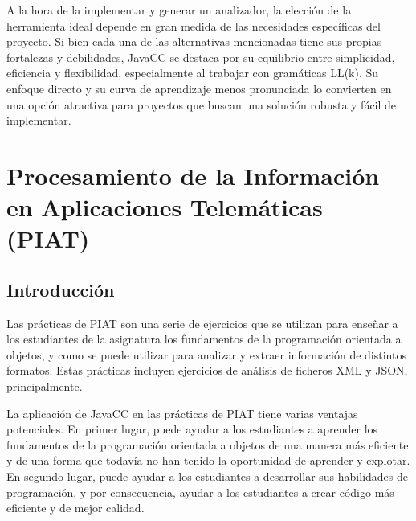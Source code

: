 
A la hora de la implementar y generar un analizador, la elección de la herramienta ideal depende en gran medida de las necesidades específicas del proyecto. Si bien cada una de las alternativas mencionadas tiene sus propias fortalezas y debilidades, JavaCC se destaca por su equilibrio entre simplicidad, eficiencia y flexibilidad, especialmente al trabajar con gramáticas LL(k). Su enfoque directo y su curva de aprendizaje menos pronunciada lo convierten en una opción atractiva para proyectos que buscan una solución robusta y fácil de implementar.

\section{Procesamiento de la Información en Aplicaciones Telemáticas (PIAT)}
\subsection{Introducción}
\noindent Las prácticas de PIAT son una serie de ejercicios que se utilizan para enseñar a los estudiantes de la asignatura los fundamentos de la programación orientada a objetos, y como se puede utilizar para analizar y extraer información de distintos formatos. Estas prácticas incluyen ejercicios de análisis de ficheros XML y JSON, principalmente.

La aplicación de JavaCC en las prácticas de PIAT tiene varias ventajas potenciales. En primer lugar, puede ayudar a los estudiantes a aprender los fundamentos de la programación orientada a objetos de una manera más eficiente y de una forma que todavía no han tenido la oportunidad de aprender y explotar. En segundo lugar, puede ayudar a los estudiantes a desarrollar sus habilidades de programación, y por consecuencia, ayudar a los estudiantes a crear código más eficiente y de mejor calidad.
